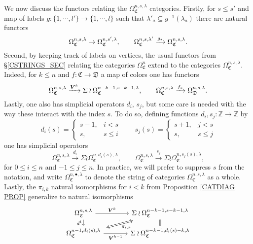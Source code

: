 \documentclass[a4paper,10pt
,draft
]{article}%
\numberwithin{equation}{section}
\numberwithin{figure}{section}
\theoremstyle{definition} %
\newcommand{\1}{\ensuremath{\mathbbm 1}}%
\begin{document}
We now discuss the functors relating the $\Omega_{\mathfrak{C}}^{n,s,\lambda}$ categories. Firstly, for 
$s \leq s'$ 
and map of labels $g \colon \{1,\cdots,l'\} \to \{1,\cdots,l\}$
such that $\lambda'_a \subseteq g^{-1}\left( \lambda_a\right)$
there are natural functors
\[
\Omega_{\mathfrak{C}}^{n,s,\lambda} \to \Omega_{\mathfrak{C}}^{n,s',\lambda},
\qquad
\Omega_{\mathfrak{C}}^{n,s,\lambda'} \xrightarrow{g_{\**}} \Omega_{\mathfrak{C}}^{n,s,\lambda}.
\]
Second, by keeping track of labels on vertices,
the usual functors from \S \ref{CSTRINGS_SEC} relating the categories 
$\Omega^n_{\mathfrak{C}}$ extend to the categories
$\Omega_{\mathfrak{C}}^{n,s,\lambda}$. Indeed, for 
$k \leq n$
and 
$f \colon \mathfrak{C} \to \mathfrak{D}$ a map of colors
one has functors
\begin{equation}\label{FGTLABEL EQ}
\Omega_{\mathfrak{C}}^{n,s,\lambda} \xrightarrow{\boldsymbol{V}^k} \Sigma \wr\Omega_{\mathfrak{C}}^{n-k-1,s-k-1,\lambda},
\qquad
\Omega_{\mathfrak{C}}^{n,s,\lambda} \xrightarrow{f_{\**}} \Omega_{\mathfrak{D}}^{n,s,\lambda}.
\end{equation}
Lastly, one also has simplicial operators $d_i$, $s_j$, 
but some care is needed with the way these interact with the index $s$. To do so, defining functions $d_i,s_j\colon \mathbb{Z} \to \mathbb{Z}$ by
\begin{equation}\label{SIMPLEXP EQ}
 d_i(s) = 
\begin{cases}
s-1, & i<s
\\
s, & s\leq i
\end{cases}
\qquad
s_j(s) = 
\begin{cases}
s+1, & j<s
\\
s, & s\leq j
\end{cases}
\end{equation}
one has simplicial operators
\[
\Omega_{\mathfrak{C}}^{n,s,\lambda} \xrightarrow{d_i} \Sigma \wr\Omega_{\mathfrak{C}}^{n,d_i(s),\lambda},
\qquad
\Omega_{\mathfrak{C}}^{n,s,\lambda} \xrightarrow{s_j} \Sigma \wr\Omega_{\mathfrak{C}}^{n,s_j(s),\lambda},
\]
for $0\leq i \leq n$ and $-1\leq j \leq n$.
In practice, we will prefer to suppress $s$ from the notation,
and write 
$\Omega_{\mathfrak{C}}^{n,\bullet,\lambda}$ to denote the string of categories 
$\Omega_{\mathfrak{C}}^{n,s,\lambda}$ as a whole.
Lastly, the $\pi_{i,k}$ natural isomorphisms for $i<k$ from Proposition \ref{CATDIAG PROP}
generalize to natural isomorphisms
\begin{equation}
\begin{tikzcd}[row sep = tiny, column sep = 35pt]
	\Omega_{\mathfrak{C}}^{n,s,\lambda}
	\arrow{r}{\boldsymbol{V}^k} \arrow{dd}[swap]{d^i} &
	|[alias=U]|
	 \Sigma \wr \Omega_{\mathfrak{C}}^{n-k-1,s-k-1,\lambda}
	 \ar[equal]{dd}{}
\\
\\
	|[alias=V]|
	\Omega_{\mathfrak{C}}^{n-1,d_i(s),\lambda} \arrow{r}[swap]{\boldsymbol{V}^{k-1}} &
	 \Sigma \wr \Omega_{\mathfrak{C}}^{n-k-1,d_i(s)-k,\lambda}
\arrow[Leftrightarrow, from=V, to=U,shorten >=0.15cm,shorten <=0.15cm
,swap,"\pi_{i,k}"
]
\end{tikzcd}
\end{equation}
\end{document}
